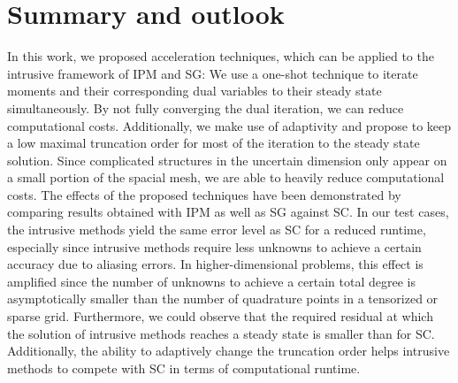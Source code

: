 \section{Summary and outlook}
\label{sec:summary_outlook}
In this work, we proposed acceleration techniques, which can be applied to the intrusive framework of IPM and SG: We use a one-shot technique to iterate moments and their corresponding dual variables to their steady state simultaneously. By not fully converging the dual iteration, we can reduce computational costs. Additionally, we make use of adaptivity and propose to keep a low maximal truncation order for most of the iteration to the steady state solution. Since complicated structures in the uncertain dimension only appear on a small portion of the spacial mesh, we are able to heavily reduce computational costs. The effects of the proposed techniques have been demonstrated by comparing results obtained with IPM as well as SG against SC. In our test cases, the intrusive methods yield the same error level as SC for a reduced runtime, especially since intrusive methods require less unknowns to achieve a certain accuracy due to aliasing errors. In higher-dimensional problems, this effect is amplified since the number of unknowns to achieve a certain total degree is asymptotically smaller than the number of quadrature points in a tensorized or sparse grid. Furthermore, we could observe that the required residual at which the solution of intrusive methods reaches a steady state is smaller than for SC. Additionally, the ability to adaptively change the truncation order helps intrusive methods to compete with SC in terms of computational runtime.


